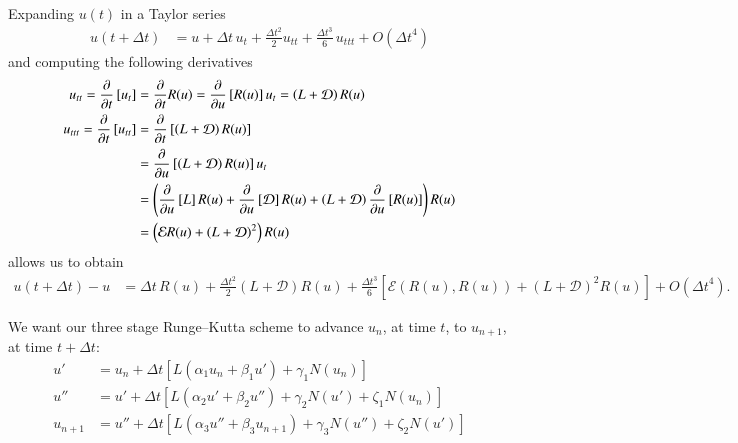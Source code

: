 \documentclass[letterpaper,11pt]{amsart}
\newcommand{\order}[2]{\ensuremath{O\!\left( {#1}^{#2} \right)}}
\begin{document}
Expanding $u(t)$ in a Taylor series
\begin{align}
  u\left( t+\Delta{}t \right)
  &=
  u
  +
  \Delta{}t\,u_{t}
  +
  \frac{\Delta{}t^{2}}{2}u_{tt}
  +
  \frac{\Delta{}t^{3}}{6}\,u_{ttt}
  +
  \order{\Delta{}t}{4}
\end{align}
and computing the following derivatives
\begin{subequations}
\begin{align}
  u_{tt}
  =
  \frac{\partial}{\partial{}t}
  \left[u_{t}\right]
  &=
  \frac{\partial}{\partial{}t} R(u)
  =
  \frac{\partial}{\partial{}u} \left[ R(u) \right]
  u_{t}
  =
  \left( L + \mathcal{D} \right) R(u)
\\
  u_{ttt}
  =
  \frac{\partial}{\partial{}t}
  \left[u_{tt}\right]
  &=
  \frac{\partial}{\partial{}t}
  \left[
    \left( L + \mathcal{D} \right) R(u)
  \right]
\\
\notag
  &=
  \frac{\partial}{\partial{}u}
  \left[
    \left( L + \mathcal{D} \right) R(u)
  \right]
  u_{t}
\\
\notag
  &=
  \left(
  \frac{\partial}{\partial{}u}
  \left[ L \right] R(u)
  +
  \frac{\partial}{\partial{}u}
  \left[ \mathcal{D} \right] R(u)
  +
  \left(L + \mathcal{D}\right)
  \frac{\partial}{\partial{}u}
  \left[ R(u) \right]
  \right)
  R(u)
\\
\notag
  &=
  \left(
  \mathcal{E} R(u)
  +
  \left(L + \mathcal{D}\right)^{2}
  \right)
  R(u)
\end{align}
\end{subequations}
allows us to obtain
\begin{align}
  u\left( t+\Delta{}t \right) - u
  &=
  \Delta{}t\,R(u)
  +
  \frac{\Delta{}t^{2}}{2}
  \left( L + \mathcal{D} \right) R(u)
  +
  \frac{\Delta{}t^{3}}{6}
  \left[
    \mathcal{E}\left( R(u), R(u) \right)
    +
    \left(L + \mathcal{D}\right)^{2} R(u)
  \right]
  +
  \order{\Delta{}t}{4}
  .
\end{align}

We want our three stage Runge--Kutta scheme to advance
$u_{n}$, at time $t$, to $u_{n+1}$, at time $t+\Delta{}t$:
\begin{subequations}
\begin{align}
  u'
  &=
  u_{n}
  + \Delta{}t\left[
      L\left( \alpha_{1}u_{n} + \beta_{1}u' \right)
    + \gamma_{1} N(u_{n})
  \right]
\\
  u''
  &=
  u'
  + \Delta{}t\left[
    L\left( \alpha_{2}u' + \beta_{2}u'' \right)
    + \gamma_{2} N(u') + \zeta_{1} N(u_{n})
  \right]
\\
  u_{n+1}
  &=
  u''
  + \Delta{}t\left[
      L\left( \alpha_{3}u'' + \beta_{3}u_{n+1} \right)
    + \gamma_{3} N(u'') + \zeta_{2} N(u')
  \right]
\end{align}
\end{subequations}
\end{document}
